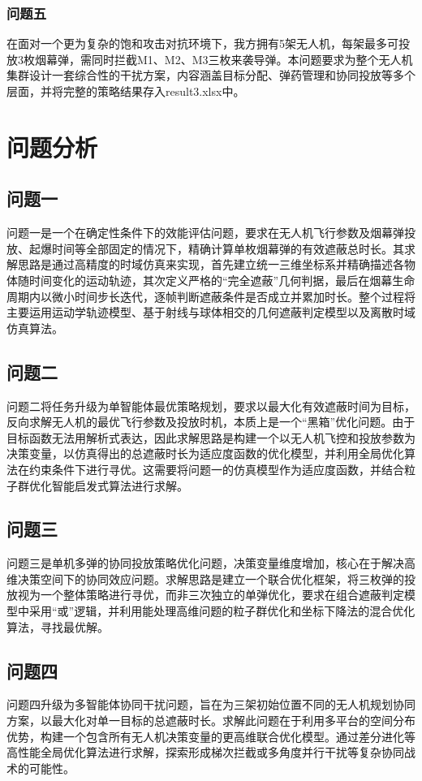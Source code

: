 \documentclass[5pt, withoutpreface,bwprint]{cumcmthesis} %
\begin{document}
        \subsubsection{问题五}
        在面对一个更为复杂的饱和攻击对抗环境下，我方拥有5架无人机，每架最多可投放3枚烟幕弹，需同时拦截M1、M2、M3三枚来袭导弹。本问题要求为整个无人机集群设计一套综合性的干扰方案，内容涵盖目标分配、弹药管理和协同投放等多个层面，并将完整的策略结果存入result3.xlsx中。
\section{问题分析}
    
    \subsection{问题一}
    问题一是一个在确定性条件下的效能评估问题，要求在无人机飞行参数及烟幕弹投放、起爆时间等全部固定的情况下，精确计算单枚烟幕弹的有效遮蔽总时长。其求解思路是通过高精度的时域仿真来实现，首先建立统一三维坐标系并精确描述各物体随时间变化的运动轨迹，其次定义严格的“完全遮蔽”几何判据，最后在烟幕生命周期内以微小时间步长迭代，逐帧判断遮蔽条件是否成立并累加时长。整个过程将主要运用运动学轨迹模型、基于射线与球体相交的几何遮蔽判定模型以及离散时域仿真算法。
    \subsection{问题二}
    问题二将任务升级为单智能体最优策略规划，要求以最大化有效遮蔽时间为目标，反向求解无人机的最优飞行参数及投放时机，本质上是一个“黑箱”优化问题。由于目标函数无法用解析式表达，因此求解思路是构建一个以无人机飞控和投放参数为决策变量，以仿真得出的总遮蔽时长为适应度函数的优化模型，并利用全局优化算法在约束条件下进行寻优。这需要将问题一的仿真模型作为适应度函数，并结合粒子群优化智能启发式算法进行求解。
    \subsection{问题三}
    问题三是单机多弹的协同投放策略优化问题，决策变量维度增加，核心在于解决高维决策空间下的协同效应问题。求解思路是建立一个联合优化框架，将三枚弹的投放视为一个整体策略进行寻优，而非三次独立的单弹优化，要求在组合遮蔽判定模型中采用“或”逻辑，并利用能处理高维问题的粒子群优化和坐标下降法的混合优化算法，寻找最优解。
    \subsection{问题四}
    问题四升级为多智能体协同干扰问题，旨在为三架初始位置不同的无人机规划协同方案，以最大化对单一目标的总遮蔽时长。求解此问题在于利用多平台的空间分布优势，构建一个包含所有无人机决策变量的更高维联合优化模型。通过差分进化等高性能全局优化算法进行求解，探索形成梯次拦截或多角度并行干扰等复杂协同战术的可能性。
\end{document}
